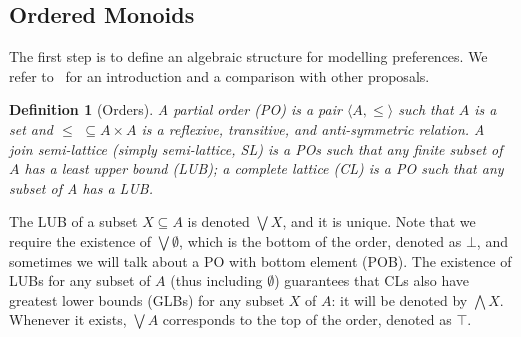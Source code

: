 \documentclass[a4paper]{elsarticle}
\newtheorem{definition}{Definition}
\newcommand{\1}{\mathbf{1}}
\begin{document}
\subsection{Ordered Monoids}
\label{sec:lem}

The first step is to define an algebraic structure for modelling preferences. 
We refer to~\cite{ipl} %
for an introduction and a comparison with other proposals.

\begin{definition}[Orders]
	A partial order (PO) is a pair $\langle A, \leq \rangle$ such that
	$A$ is a set %
	and $\leq \,\,\subseteq A \times A$ is a reflexive, transitive, and
	anti-symmetric  relation.
	A join semi-lattice (simply semi-lattice, SL) is a POs
	such that any finite subset of $A$ has a least upper bound (LUB);
	a complete lattice (CL) is a PO such that any subset of A has a LUB.
\end{definition}

The LUB of a subset $X \subseteq A$ is denoted $\bigvee X$, and it is unique. 
Note that we require the existence of $\bigvee \emptyset$, which is the bottom
of the order, denoted as $\bot$, and sometimes we will talk about a PO with bottom element
(POB).
The existence of LUBs for any subset of $A$ (thus including $\emptyset$) guarantees that 
CLs also have greatest lower bounds (GLBs) for any subset $X$ of $A$: 
it will be denoted by $\bigwedge X$. 
Whenever it exists, 
$\bigvee A$ corresponds to the top of the order, denoted as $\top$.
%

%

\end{document}
